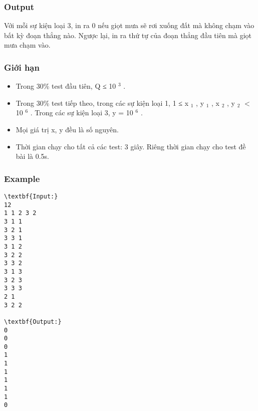\subsubsection{Output}

Với mỗi sự kiện loại 3, in ra 0 nếu giọt mưa sẽ rơi xuống đất mà không chạm vào bất kỳ đoạn thẳng nào. Ngược lại, in ra thứ tự của đoạn thẳng đầu tiên mà giọt mưa chạm vào.

\subsubsection{Giới hạn}
\begin{itemize}
	\item Trong 30\% test đầu tiên, Q ≤ 10 $^ 3 $ .
	\item Trong 30\% test tiếp theo, trong các sự kiện loại 1, 1 ≤ x $_ 1 $ , y $_ 1 $ , x $_ 2 $ , y $_ 2 $ $<$ 10 $^ 6 $ . Trong các sự kiện loại 3, y = 10 $^ 6 $ .
	\item Mọi giá trị x, y đều là số nguyên.
	\item Thời gian chạy cho tất cả các test: 3 giây. Riêng thời gian chạy cho test đề bài là 0.5s.
\end{itemize}

\subsubsection{Example}
\begin{verbatim}
\textbf{Input:}
12
1 1 2 3 2
3 1 1
3 2 1
3 3 1
3 1 2
3 2 2
3 3 2
3 1 3
3 2 3
3 3 3
2 1
3 2 2

\textbf{Output:}
0
0
0
1
1
1
1
1
1
0
\end{verbatim}